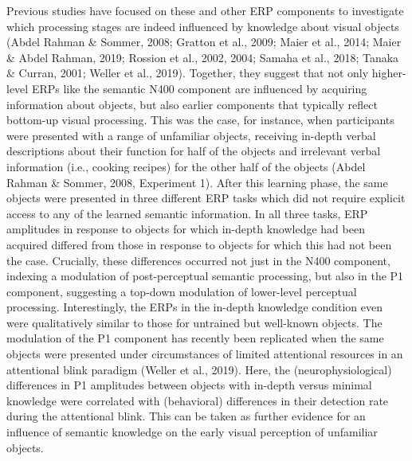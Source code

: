 \documentclass[
  english,
  man,floatsintext]{apa7}
\begin{document}
Previous studies have focused on these and other ERP components to investigate which processing stages are indeed influenced by knowledge about visual objects (Abdel Rahman \& Sommer, 2008; Gratton et al., 2009; Maier et al., 2014; Maier \& Abdel Rahman, 2019; Rossion et al., 2002, 2004; Samaha et al., 2018; Tanaka \& Curran, 2001; Weller et al., 2019). Together, they suggest that not only higher-level ERPs like the semantic N400 component are influenced by acquiring information about objects, but also earlier components that typically reflect bottom-up visual processing. This was the case, for instance, when participants were presented with a range of unfamiliar objects, receiving in-depth verbal descriptions about their function for half of the objects and irrelevant verbal information (i.e., cooking recipes) for the other half of the objects (Abdel Rahman \& Sommer, 2008, Experiment 1). After this learning phase, the same objects were presented in three different ERP tasks which did not require explicit access to any of the learned semantic information. In all three tasks, ERP amplitudes in response to objects for which in-depth knowledge had been acquired differed from those in response to objects for which this had not been the case. Crucially, these differences occurred not just in the N400 component, indexing a modulation of post-perceptual semantic processing, but also in the P1 component, suggesting a top-down modulation of lower-level perceptual processing. Interestingly, the ERPs in the in-depth knowledge condition even were qualitatively similar to those for untrained but well-known objects. The modulation of the P1 component has recently been replicated when the same objects were presented under circumstances of limited attentional resources in an attentional blink paradigm (Weller et al., 2019). Here, the (neurophysiological) differences in P1 amplitudes between objects with in-depth versus minimal knowledge were correlated with (behavioral) differences in their detection rate during the attentional blink. This can be taken as further evidence for an influence of semantic knowledge on the early visual perception of unfamiliar objects.
\end{document}
